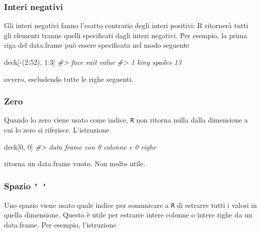 \documentclass[
  11pt,
]{krantz}
\makeatletter
\newenvironment{Shaded}{\begin{snugshade}}{\end{snugshade}}
\newcommand{\CommentTok}[1]{\textcolor[rgb]{0.37,0.37,0.37}{\textit{#1}}}
\newcommand{\DecValTok}[1]{\textcolor[rgb]{0.06,0.06,0.06}{#1}}
\newcommand{\NormalTok}[1]{#1}
\newcommand{\SpecialCharTok}[1]{\textcolor[rgb]{0,0,0}{#1}}
\newenvironment{kframe}{%
\medskip{}
\setlength{\fboxsep}{.8em}
 \def\at@end@of@kframe{}%
 \ifinner\ifhmode%
  \def\at@end@of@kframe{\end{minipage}}%
  \begin{minipage}{\columnwidth}%
 \fi\fi%
 \def\FrameCommand##1{\hskip\@totalleftmargin \hskip-\fboxsep
 \colorbox{shadecolor}{##1}\hskip-\fboxsep
     \hskip-\linewidth \hskip-\@totalleftmargin \hskip\columnwidth}%
 \MakeFramed {\advance\hsize-\width
   \@totalleftmargin\z@ \linewidth\hsize
   \@setminipage}}%
 {\par\unskip\endMakeFramed%
 \at@end@of@kframe}
\renewenvironment{Shaded}{\begin{kframe}}{\end{kframe}}
\theoremstyle{definition}
\theoremstyle{definition}
\theoremstyle{definition}
\theoremstyle{definition}
\theoremstyle{remark}
\makeatother
\begin{document}
\hypertarget{interi-negativi}{%
\subsubsection{Interi negativi}\label{interi-negativi}}

Gli interi negativi fanno l'esatto contrario degli interi positivi: R ritornerà tutti gli elementi tranne quelli specificati dagli interi negativi. Per esempio, la prima riga del data.frame può essere specificata nel modo seguente

\begin{Shaded}
\begin{Highlighting}[]
\NormalTok{deck[}\SpecialCharTok{{-}}\NormalTok{(}\DecValTok{2}\SpecialCharTok{:}\DecValTok{52}\NormalTok{), }\DecValTok{1}\SpecialCharTok{:}\DecValTok{3}\NormalTok{]}
\CommentTok{\#\textgreater{}   face   suit value}
\CommentTok{\#\textgreater{} 1 king spades    13}
\end{Highlighting}
\end{Shaded}

ovvero, escludendo tutte le righe seguenti.

\hypertarget{zero}{%
\subsubsection{Zero}\label{zero}}

Quando lo zero viene usato come indice, \texttt{R} non ritorna nulla dalla dimensione a cui lo zero si riferisce. L'istruzione

\begin{Shaded}
\begin{Highlighting}[]
\NormalTok{deck[}\DecValTok{0}\NormalTok{, }\DecValTok{0}\NormalTok{]}
\CommentTok{\#\textgreater{} data frame con 0 colonne e 0 righe}
\end{Highlighting}
\end{Shaded}

ritorna un data.frame vuoto. Non molto utile.

\hypertarget{spazio}{%
\subsubsection{\texorpdfstring{Spazio \texttt{’\ ’}}{Spazio ' '}}\label{spazio}}

Uno spazio viene usato quale indice per comunicare a \texttt{R} di estrarre tutti i valori in quella dimensione. Questo è utile per estrarre intere colonne o intere righe da un data.frame. Per esempio, l'istruzione
\end{document}
